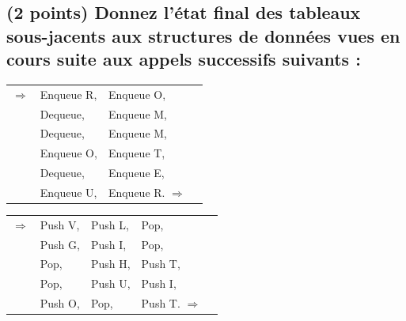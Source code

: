 \documentclass[11pt,a4paper]{article}
\begin{document}
\bigskip


\bigskip
\bigskip


\subsection{(2 points) Donnez l'état final des tableaux sous-jacents aux structures de données vues en cours suite aux appels successifs suivants : }


\begin{center}
\begin{table}[ht!]
  \centering
  \begin{minipage}{0.45\textwidth}


\begin{center}
\begin{tabular}{ c L{2.5cm} L{2.5cm} c }
$\Rightarrow$
& Enqueue R, & Enqueue O, & \phantom{Iq} \\
& Dequeue,   & Enqueue M, & \phantom{Iq} \\
& Dequeue,   & Enqueue M, & \phantom{Iq} \\
& Enqueue O, & Enqueue T, & \phantom{Iq} \\
& Dequeue,   & Enqueue E, & \phantom{Iq} \\
& Enqueue U, & Enqueue R. $\Rightarrow$ & \phantom{Iq} \\
\end{tabular}
\end{center}

  \end{minipage}
  \hfillx
  \begin{minipage}{0.01\textwidth}


  \end{minipage}
  \hfillx
  \begin{minipage}{0.45\textwidth}


\begin{center}
\begin{tabular}{ c L{2cm} L{2cm} L{2cm} c }
$\Rightarrow$ & Push V, & Push L, & Pop,     & \phantom{Iq} \\
& Push G, & Push I, & Pop,     & \phantom{Iq} \\
& Pop,    & Push H, & Push T,  & \phantom{Iq} \\
& Pop,    & Push U, & Push I,  & \phantom{Iq} \\
& Push O, & Pop,    & Push T. $\Rightarrow$ & \phantom{Iq} \\
\end{tabular}
\end{center}


\end{minipage}
\end{table}
\end{center}
\end{document}
